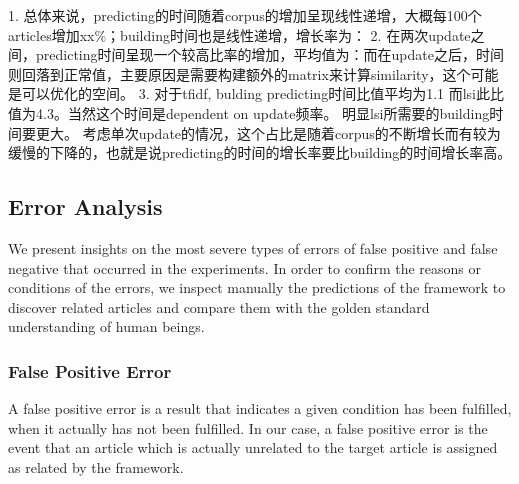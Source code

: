 1. 总体来说，predicting的时间随着corpus的增加呈现线性递增，大概每100个articles增加xx\%；building时间也是线性递增，增长率为：
2. 在两次update之间，predicting时间呈现一个较高比率的增加，平均值为：而在update之后，时间则回落到正常值，主要原因是需要构建额外的matrix来计算similarity，这个可能是可以优化的空间。
3. 对于tfidf, bulding predicting时间比值平均为1.1 而lsi此比值为4.3。当然这个时间是dependent on update频率。 明显lsi所需要的building时间要更大。 考虑单次update的情况，这个占比是随着corpus的不断增长而有较为缓慢的下降的，也就是说predicting的时间的增长率要比building的时间增长率高。

\subsection{Error Analysis}
\label{sec:5.5}

We present insights on the most severe types of errors of false positive and false negative that occurred in the experiments. In order to confirm the reasons or conditions of the errors, we inspect manually the predictions of the framework to discover related articles and compare them with the golden standard understanding of human beings.  

\subsubsection{False Positive Error}

A false positive error is a result that indicates a given condition has been fulfilled, when it actually has not been fulfilled. In our case, a false positive error is the event that an article which is actually unrelated to the target article is assigned as related by the framework. 

